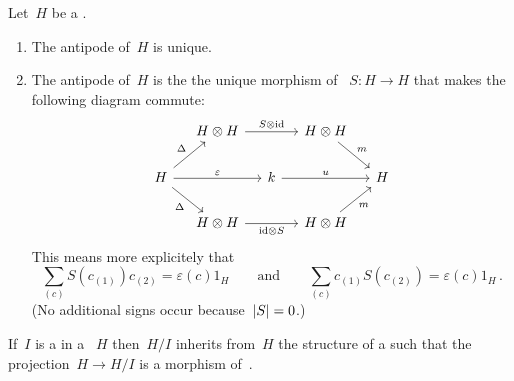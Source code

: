 \documentclass[a4paper,10pt,headings=standardclasses]{scrartcl}
\begin{document}
\begin{remark}
  Let~$H$ be a {\dgh}.
  \begin{enumerate}
    \item
      The antipode of~$H$ is unique.
    \item
      The antipode of~$H$ is the the unique morphism of {\dgvs}~$S \colon H \to H$ that makes the following diagram commute:
      \begin{equation}
        \label{antipode diagram}
        \begin{tikzcd}[column sep = small]
          {}
          &
          H \tensor H
          \arrow{rr}[above]{S \tensor {\id}}
          &
          {}
          &
          H \tensor H
          \arrow{dr}[above right]{m}
          &
          {}
          \\
          H
          \arrow{ur}[above left]{\Delta}
          \arrow{rr}[above]{\varepsilon}
          \arrow{dr}[below left]{\Delta}
          &
          {}
          &
          k
          \arrow{rr}[above]{u}
          &
          {}
          &
          H
          \\
          {}
          &
          H \tensor H
          \arrow{rr}[below]{{\id} \tensor S}
          &
          {}
          &
          H \tensor H
          \arrow{ur}[below right]{m}
          &
          {}
        \end{tikzcd}
      \end{equation}
      This means more explicitely that
      \[
        \sum_{(c)} S(c_{(1)}) c_{(2)}
        =
        \varepsilon(c) 1_H
        \qquad\text{and}\qquad
        \sum_{(c)} c_{(1)} S(c_{(2)})
        =
        \varepsilon(c) 1_H  \,.
      \]
      (No additional signs occur because~$\lvert S\rvert = 0$.)
  \end{enumerate}
\end{remark}%

\begin{lemma}
  If~$I$ is a {\dghi} in a {\dgh}~$H$ then~$H/I$ inherits from~$H$ the structure of a {\dgh} such that the projection~$H \to H/I$ is a morphism of~{\dghs}.
\end{lemma}

% 
\end{document}
